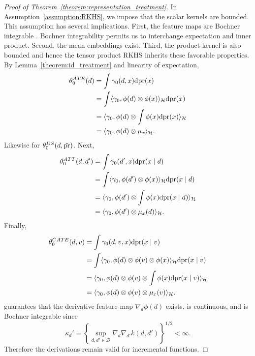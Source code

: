 \begin{proof}[Proof of Theorem~\ref{theorem:representation_treatment}]
In Assumption~\ref{assumption:RKHS}, we impose that the scalar kernels are bounded. This assumption has several implications. First, the feature maps are Bochner integrable \cite[Definition A.5.20]{steinwart2008support}. Bochner integrability permits us to interchange expectation and inner product. Second, the mean embeddings exist. Third, the product kernel is also bounded and hence the tensor product RKHS inherits these favorable properties. By Lemma~\ref{theorem:id_treatment} and linearity of expectation,
 \begin{align*}
    \theta_0^{ATE}(d)&= \int \gamma_0(d,x)\mathrm{d}\text{\normalfont pr}(x)\\
    &=\int \langle \gamma_0, \phi(d)\otimes \phi(x)\rangle_{\mathcal{H}}  \mathrm{d}\text{\normalfont pr}(x) \\
    &= \langle \gamma_0, \phi(d)\otimes \int\phi(x) \mathrm{d}\text{\normalfont pr}(x) \rangle_{\mathcal{H}} \\
    &= \langle \gamma_0, \phi(d)\otimes \mu_x \rangle_{\mathcal{H}}.
\end{align*}
Likewise for $\theta_0^{DS}(d,\tilde{\text{\normalfont pr}})$. Next,
\begin{align*}
    \theta_0^{ATT}(d,d')&= \int \gamma_0(d',x)\mathrm{d}\text{\normalfont pr}(x \mid d)\\
    &=\int \langle \gamma_0, \phi(d')\otimes \phi(x)\rangle_{\mathcal{H}}  \mathrm{d}\text{\normalfont pr}(x \mid d) \\
    &= \langle \gamma_0, \phi(d')\otimes \int\phi(x) \mathrm{d}\text{\normalfont pr}(x \mid d) \rangle_{\mathcal{H}}\\
    &= \langle \gamma_0, \phi(d')\otimes \mu_x(d) \rangle_{\mathcal{H}}.
\end{align*}
Finally, 
 \begin{align*}
    \theta_0^{CATE}(d,v)&= \int \gamma_0(d,v,x)\mathrm{d}\text{\normalfont pr}(x \mid v)\\
    &=\int \langle \gamma_0, \phi(d)\otimes \phi(v) \otimes \phi(x)\rangle_{\mathcal{H}}  \mathrm{d}\text{\normalfont pr}(x \mid v) \\
    &= \langle \gamma_0, \phi(d)\otimes \phi(v) \otimes \int\phi(x) \mathrm{d}\text{\normalfont pr}(x \mid v) \rangle_{\mathcal{H}} \\
    &= \langle \gamma_0, \phi(d)\otimes \phi(v) \otimes \mu_{x}(v) \rangle_{\mathcal{H}}.
\end{align*}
\cite[Lemma 4.34]{steinwart2008support} guarantees that the derivative feature map $\nabla_d\phi(d)$ exists, is continuous, and is Bochner integrable since $$\kappa_d'=\left\{\sup_{d,d'\in\mathcal{D}}\nabla_d\nabla_{d'}k(d,d')\right\}^{1/2}<\infty.$$ Therefore the derivations remain valid for incremental functions.
\end{proof}

